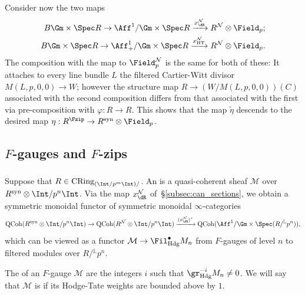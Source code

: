 \documentclass[10pt]{amsart}
\begin{document}
\subsubsection{}
Consider now the two maps
\begin{align*}
B\Gm\times \Spec R\to \Aff^1/\Gm\times \Spec R\xrightarrow{x^{\mathcal{N}}_{\dR}}R^\mathcal{N}\otimes\Field_p;\\
B\Gm\times \Spec R\to \Aff^1_+/\Gm\times \Spec R\xrightarrow{x^{\mathcal{N}}_{\mathrm{HT}}}R^\mathcal{N}\otimes\Field_p.
\end{align*}
The composition with the map to $\Field_p^{\mathcal{N}}$ is the same for both of these: It attaches to every line bundle $L$ the filtered Cartier-Witt divisor $M(L,p,0,0)\to W$; however the structure map $R\to (W/M(L,p,0,0))(C)$ associated with the second composition differs from that associated with the first via pre-composition with $\varphi:R\to R$. This shows that the map $\tilde{\eta}$ descends to the desired map $\eta:R^{\Fzip}\to R^{\mathrm{syn}}\otimes\Field_p$.



\subsection{$F$-gauges and $F$-zips}
\label{subsec:fgauges_fzips}


\subsubsection{}
Suppose that $R\in \mathrm{CRing}_{(\Int/p^m\Int)/}$. An  is a quasi-coherent sheaf $\mathcal{M}$ over $R^{\mathrm{syn}}\otimes\Int/p^n\Int$. Via the map $x^{\mathcal{N}}_{\dR}$ of~\S\ref{subsec:can_sections}, we obtain a symmetric monoidal functor of symmetric monoidal $\infty$-categories
\[
\mathrm{QCoh}(R^{\mathrm{syn}}\otimes\Int/p^n\Int)\to \mathrm{QCoh}(R^{\mathcal{N}}\otimes\Int/p^n\Int)\xrightarrow{(x^{\mathcal{N}}_{\dR})^*}\mathrm{QCoh}(\Aff^1/\Gm\times \Spec(R/{}^{\mathbb{L}}p^n)),
\]
which can be viewed as a functor $\mathcal{M}\to \Fil^\bullet_{\mathrm{Hdg}}M_n$ from $F$-gauges of level $n$ to filtered modules over $R/{}^{\mathbb{L}}p^n$. 

The  of an $F$-gauge $\mathcal{M}$ are the integers $i$ such that $\gr^{-i}_{\mathrm{Hdg}}M_n\neq 0$. We will say that $\mathcal{M}$ is  if its Hodge-Tate weights are bounded above by $1$.
\end{document}
